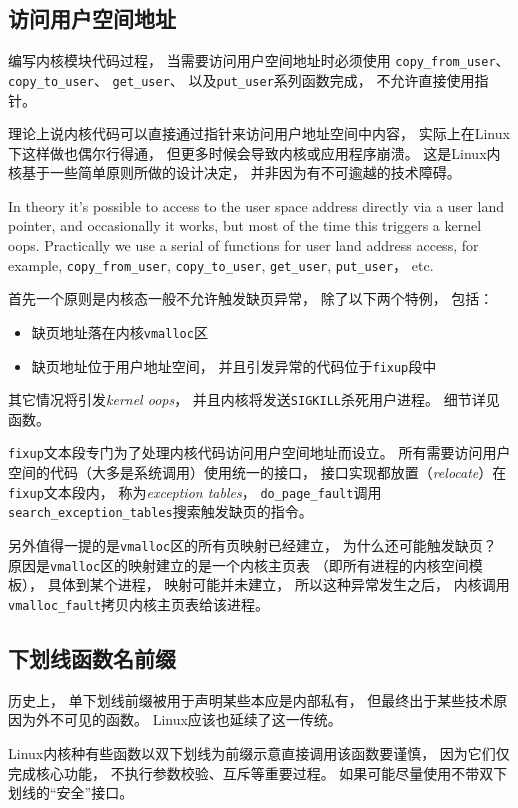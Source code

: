 \documentclass[11pt]{article}
\begin{document}
\subsection{访问用户空间地址}
编写内核模块代码过程，
当需要访问用户空间地址时必须使用%
\verb|copy_from_user|、
\verb|copy_to_user|、
\verb|get_user|、
以及\verb|put_user|系列函数完成，
不允许直接使用指针。

理论上说内核代码可以直接通过指针来访问用户地址空间中内容，
实际上在Linux下这样做也偶尔行得通，
但更多时候会导致内核或应用程序崩溃。
这是Linux内核基于一些简单原则所做的设计决定，
并非因为有不可逾越的技术障碍。

{\color{red}
In theory it's possible to access to the user space address
directly via a user land pointer,
and occasionally it works,
but most of the time this triggers a kernel oops.
Practically we use a serial of functions for user land address access,
for example,
\verb|copy_from_user|,
\verb|copy_to_user|,
\verb|get_user|,
\verb|put_user|，
etc.}

首先一个原则是内核态一般不允许触发缺页异常，
除了以下两个特例，
包括：
\begin{itemize}
  \item 缺页地址落在内核\verb|vmalloc|区
  \item 缺页地址位于用户地址空间，
  并且引发异常的代码位于\verb|fixup|段中
\end{itemize}
其它情况将引发{\em kernel oops}，
并且内核将发送\verb|SIGKILL|杀死用户进程。
细节详见函数。

\verb|fixup|文本段专门为了处理内核代码访问用户空间地址而设立。
所有需要访问用户空间的代码（大多是系统调用）使用统一的接口，
接口实现都放置（{\em relocate}）在\verb|fixup|文本段内，
称为{\em exception tables}，
\verb|do_page_fault|调用\verb|search_exception_tables|搜索触发缺页的指令。

另外值得一提的是\verb|vmalloc|区的所有页映射已经建立，
为什么还可能触发缺页？
原因是\verb|vmalloc|区的映射建立的是一个内核主页表
（即所有进程的内核空间模板），
具体到某个进程，
映射可能并未建立，
所以这种异常发生之后，
内核调用\verb|vmalloc_fault|拷贝内核主页表给该进程。

\subsection{下划线函数名前缀}
历史上，
单下划线前缀被用于声明某些本应是内部私有，
但最终出于某些技术原因为外不可见的函数。
Linux应该也延续了这一传统。

Linux内核种有些函数以双下划线为前缀示意直接调用该函数要谨慎，
因为它们仅完成核心功能，
不执行参数校验、互斥等重要过程。
如果可能尽量使用不带双下划线的``安全''接口。
\end{document}
